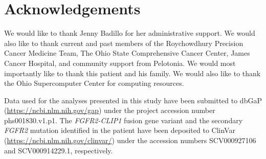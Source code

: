 \section*{Acknowledgements}
We would like to thank Jenny Badillo for her administrative support. We would also like to thank current and past members of the Roychowdhury Precision Cancer Medicine Team, The Ohio State Comprehensive Cancer Center, James Cancer Hospital, and community support from Pelotonia. We would most importantly like to thank this patient and his family. We would also like to thank the Ohio Supercomputer Center for computing resources.

Data used for the analyses presented in this study have been submitted to dbGaP (\url{https://ncbi.nlm.nih.gov/gap}) under the project accession number phs001830.v1.p1. The \textit{FGFR2-CLIP1} fusion gene variant and the secondary \textit{FGFR2} mutation identified in the patient have been deposited to ClinVar (\url{https://ncbi.nlm.nih.gov/clinvar/}) under the accession numbers SCV000927106 and SCV000914229.1, respectively.
